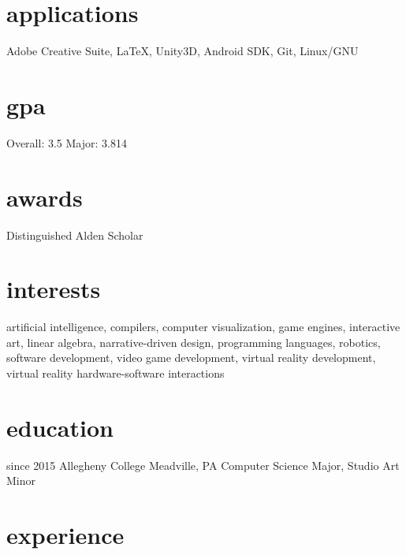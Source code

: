 \documentclass[]{friggeri-cv}
\begin{document}
\begin{aside}
  \section{applications}\vspace{0.05cm}
    Adobe Creative Suite, \LaTeX , Unity3D, Android SDK, Git, Linux/GNU
  \section{gpa}\vspace{0.1cm}
  	Overall: 3.5
  	Major: 3.814\vspace{0.1cm}
  \section{awards}\vspace{0.05cm}
    Distinguished Alden Scholar\vspace{0.1cm}
\end{aside}

\section{interests}

artificial intelligence, compilers, computer visualization, game engines, interactive art, linear algebra, narrative-driven design, programming languages, robotics, software development, video game development, virtual reality development, virtual reality hardware-software interactions

\section{education}
\begin{entrylist}
  \entry
    {since 2015}
    {Allegheny College}
    {Meadville, PA}
    {Computer Science Major, Studio Art Minor}
\end{entrylist}

\section{experience}
\end{document}

